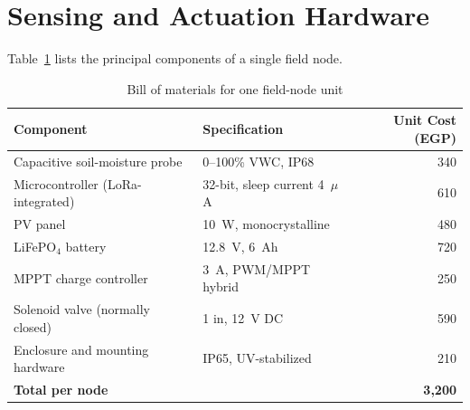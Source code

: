 \section{Sensing and Actuation Hardware}
Table~\ref{tab:bom} lists the principal components of a single field node.

\begin{table}[H]
\centering
\caption{Bill of materials for one field-node unit}
\label{tab:bom}
\begin{tabularx}{\textwidth}{@{}lXr@{}}
\toprule
\rowcolor{cairoblue!10}
\textbf{Component} & \textbf{Specification} & \textbf{Unit Cost (EGP)} \\
\midrule
Capacitive soil-moisture probe & 0--100\% VWC, IP68 & 340 \\
Microcontroller (LoRa-integrated) & 32-bit, sleep current 4~$\mu$A & 610 \\
PV panel & 10~W, monocrystalline & 480 \\
LiFePO$_4$ battery & 12.8~V, 6~Ah & 720 \\
MPPT charge controller & 3~A, PWM/MPPT hybrid & 250 \\
Solenoid valve (normally closed) & 1 in, 12~V DC & 590 \\
Enclosure and mounting hardware & IP65, UV-stabilized & 210 \\
\midrule
\textbf{Total per node} & & \textbf{3{,}200} \\
\bottomrule
\end{tabularx}
\end{table}
